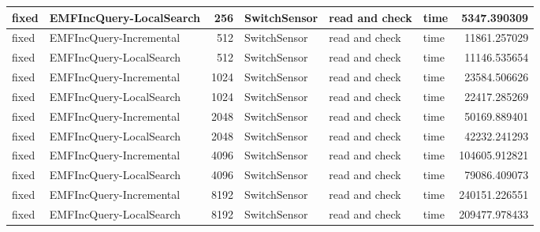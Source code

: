 \begin{table}
\begin{tabular}{| l | l | r | l | l | l | r |}
fixed & EMFIncQuery-LocalSearch & 256 & SwitchSensor & read and check & time & 5347.390309\\\hline
fixed & EMFIncQuery-Incremental & 512 & SwitchSensor & read and check & time & 11861.257029\\\hline
fixed & EMFIncQuery-LocalSearch & 512 & SwitchSensor & read and check & time & 11146.535654\\\hline
fixed & EMFIncQuery-Incremental & 1024 & SwitchSensor & read and check & time & 23584.506626\\\hline
fixed & EMFIncQuery-LocalSearch & 1024 & SwitchSensor & read and check & time & 22417.285269\\\hline
fixed & EMFIncQuery-Incremental & 2048 & SwitchSensor & read and check & time & 50169.889401\\\hline
fixed & EMFIncQuery-LocalSearch & 2048 & SwitchSensor & read and check & time & 42232.241293\\\hline
fixed & EMFIncQuery-Incremental & 4096 & SwitchSensor & read and check & time & 104605.912821\\\hline
fixed & EMFIncQuery-LocalSearch & 4096 & SwitchSensor & read and check & time & 79086.409073\\\hline
fixed & EMFIncQuery-Incremental & 8192 & SwitchSensor & read and check & time & 240151.226551\\\hline
fixed & EMFIncQuery-LocalSearch & 8192 & SwitchSensor & read and check & time & 209477.978433\\\hline



\end{tabular}
\end{table}
